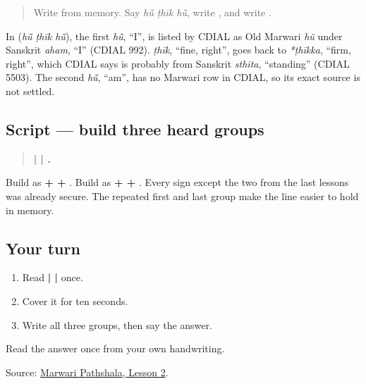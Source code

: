 \begin{quote}
Write \textbf{} from memory. Say \emph{hū̃ ṭhīk hū̃}, write \textbf{}, and write \textbf{}.
\end{quote}

\begin{cousinweb}
In \textbf{  } (\emph{hū̃ ṭhīk hū̃}), the first \emph{hū̃}, \textquotedblleft{}I\textquotedblright{}, is listed by CDIAL as Old Marwari \emph{hũ} under Sanskrit \emph{aham}, \textquotedblleft{}I\textquotedblright{} (CDIAL 992). \emph{ṭhīk}, \textquotedblleft{}fine, right\textquotedblright{}, goes back to \emph{*ṭhīkka}, \textquotedblleft{}firm, right\textquotedblright{}, which CDIAL says is probably from Sanskrit \emph{sthita}, \textquotedblleft{}standing\textquotedblright{} (CDIAL 5503). The second \emph{hū̃}, \textquotedblleft{}am\textquotedblright{}, has no Marwari row in CDIAL, so its exact source is not settled.
\end{cousinweb}

\subsection*{Script — build three heard groups}
\begin{quote}
\textbf{ |  | .}
\end{quote}

Build \textbf{} as \textbf{ +  + }. Build \textbf{} as \textbf{ +  + }. Every sign except the two from the last lessons was already secure. The repeated first and last group make the line easier to hold in memory.

\subsection*{Your turn}
\begin{enumerate}
\raggedright
  \item Read \textbf{ |  | } once.
  \item Cover it for ten seconds.
  \item Write all three groups, then say the answer.
\end{enumerate}

\begin{tcolorbox}[breakable,colback=teal!4,colframe=teal!35!black,title={Before you move on}]
Read the answer once from your own handwriting.

Source: \href{https://www.marwaripathshala.com/marwari-lesson-2-english}{Marwari Pathshala, Lesson 2}.
\end{tcolorbox}

